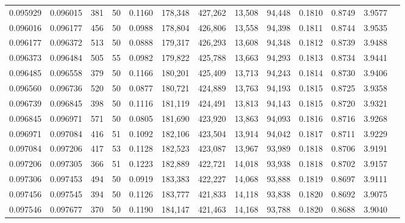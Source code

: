 \begin{tabular}{rrrrrrrrrrrrr}
0.095929 & 0.096015 &   381 &  50 &                                     0.1160 & 178,348 & 427,262 &  13,508 &  94,448 & 0.1810 & 0.8749 & 3.9577 \\
0.096016 & 0.096177 &   456 &  50 &                                     0.0988 & 178,804 & 426,806 &  13,558 &  94,398 & 0.1811 & 0.8744 & 3.9535 \\
0.096177 & 0.096372 &   513 &  50 &                                     0.0888 & 179,317 & 426,293 &  13,608 &  94,348 & 0.1812 & 0.8739 & 3.9488 \\
0.096373 & 0.096484 &   505 &  55 &                                     0.0982 & 179,822 & 425,788 &  13,663 &  94,293 & 0.1813 & 0.8734 & 3.9441 \\
0.096485 & 0.096558 &   379 &  50 &                                     0.1166 & 180,201 & 425,409 &  13,713 &  94,243 & 0.1814 & 0.8730 & 3.9406 \\
0.096560 & 0.096736 &   520 &  50 &                                     0.0877 & 180,721 & 424,889 &  13,763 &  94,193 & 0.1815 & 0.8725 & 3.9358 \\
0.096739 & 0.096845 &   398 &  50 &                                     0.1116 & 181,119 & 424,491 &  13,813 &  94,143 & 0.1815 & 0.8720 & 3.9321 \\
0.096845 & 0.096971 &   571 &  50 &                                     0.0805 & 181,690 & 423,920 &  13,863 &  94,093 & 0.1816 & 0.8716 & 3.9268 \\
0.096971 & 0.097084 &   416 &  51 &                                     0.1092 & 182,106 & 423,504 &  13,914 &  94,042 & 0.1817 & 0.8711 & 3.9229 \\
0.097084 & 0.097206 &   417 &  53 &                                     0.1128 & 182,523 & 423,087 &  13,967 &  93,989 & 0.1818 & 0.8706 & 3.9191 \\
0.097206 & 0.097305 &   366 &  51 &                                     0.1223 & 182,889 & 422,721 &  14,018 &  93,938 & 0.1818 & 0.8702 & 3.9157 \\
0.097306 & 0.097453 &   494 &  50 &                                     0.0919 & 183,383 & 422,227 &  14,068 &  93,888 & 0.1819 & 0.8697 & 3.9111 \\
0.097456 & 0.097545 &   394 &  50 &                                     0.1126 & 183,777 & 421,833 &  14,118 &  93,838 & 0.1820 & 0.8692 & 3.9075 \\
0.097546 & 0.097677 &   370 &  50 &                                     0.1190 & 184,147 & 421,463 &  14,168 &  93,788 & 0.1820 & 0.8688 & 3.9040 \\

\end{tabular}
